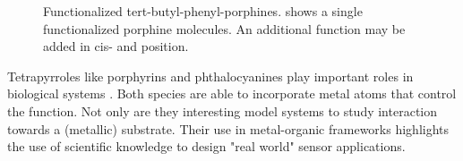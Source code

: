 \begin{figure}[h!]\centering
	\caption{Functionalized tert-butyl-phenyl-porphines.  shows a single functionalized porphine molecules. An additional function may be added in  cis-  and  position.}
	\label{fig:TBP}
\end{figure}	

Tetrapyrroles like porphyrins and phthalocyanines play important roles in biological systems \cite{battersby_tetrapyrroles_2000}. Both species are able to incorporate metal atoms that control the function. Not only are they interesting model systems to study interaction towards a (metallic) substrate\cite{auwarter_porphyrins_2015, auwarter_controlled_2007, diller_vacuo_2016}. Their use in metal-organic frameworks highlights the use of scientific knowledge to design "real world" sensor applications\cite{Lustig_Metal-organic_2017}. 



